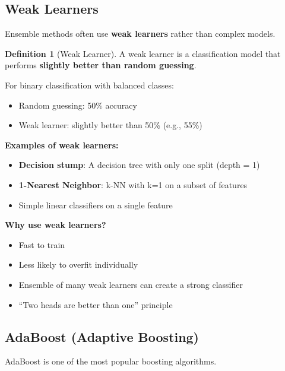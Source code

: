 \documentclass[11pt,a4paper]{article}
\theoremstyle{definition}
\newtheorem{definition}{Definition}[section]
\theoremstyle{plain}
\theoremstyle{remark}
\begin{document}
\subsection{Weak Learners}

Ensemble methods often use \textbf{weak learners} rather than complex models.

\begin{definition}[Weak Learner]
A weak learner is a classification model that performs \textbf{slightly better than random guessing}.

For binary classification with balanced classes:
\begin{itemize}
    \item Random guessing: 50\% accuracy
    \item Weak learner: slightly better than 50\% (e.g., 55\%)
\end{itemize}
\end{definition}

\textbf{Examples of weak learners:}
\begin{itemize}
    \item \textbf{Decision stump}: A decision tree with only one split (depth = 1)
    \item \textbf{1-Nearest Neighbor}: k-NN with k=1 on a subset of features
    \item Simple linear classifiers on a single feature
\end{itemize}

\textbf{Why use weak learners?}
\begin{itemize}
    \item Fast to train
    \item Less likely to overfit individually
    \item Ensemble of many weak learners can create a strong classifier
    \item ``Two heads are better than one'' principle
\end{itemize}

\subsection{AdaBoost (Adaptive Boosting)}

AdaBoost is one of the most popular boosting algorithms.
\end{document}
